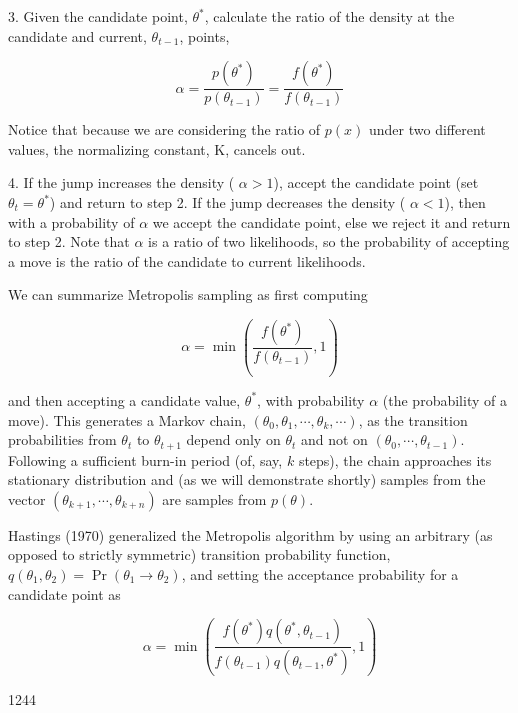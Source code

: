 \documentclass{article}
\begin{document}
3. Given the candidate point,  $ \theta^{*} $, calculate the ratio of the density at the candidate and current,  $ \theta_{t-1} $, points,

\begin{equation}
\alpha=\frac{p(\theta^{*})}{p(\theta_{t-1})}=\frac{f(\theta^{*})}{f(\theta_{t-1})}
\end{equation}

Notice that because we are considering the ratio of  $ p(x) $ under two different values, the normalizing constant, K, cancels out.

4. If the jump increases the density ( $ \alpha > 1 $), accept the candidate point (set  $ \theta_t = \theta^* $) and return to step 2. If the jump decreases the density ( $ \alpha < 1 $), then with a probability of  $ \alpha $ we accept the candidate point, else we reject it and return to step 2. Note that  $ \alpha $ is a ratio of two likelihoods, so the probability of accepting a move is the ratio of the candidate to current likelihoods.

We can summarize Metropolis sampling as first computing

\begin{equation}
\alpha=\min\left(\frac{f(\theta^{*})}{f(\theta_{t-1})},1\right)
\end{equation}

and then accepting a candidate value,  $ \theta^* $, with probability  $ \alpha $ (the probability of a move). This generates a Markov chain,  $ (\theta_0, \theta_1, \cdots, \theta_k, \cdots) $, as the transition probabilities from  $ \theta_t $ to  $ \theta_{t+1} $ depend only on  $ \theta_t $ and not on  $ (\theta_0, \cdots, \theta_{t-1}) $. Following a sufficient burn-in period (of, say,  $ k $ steps), the chain approaches its stationary distribution and (as we will demonstrate shortly) samples from the vector  $ (\theta_{k+1}, \cdots, \theta_{k+n}) $ are samples from  $ p(\theta) $.

Hastings (1970) generalized the Metropolis algorithm by using an arbitrary (as opposed to strictly symmetric) transition probability function,  $ q(\theta_1, \theta_2) = \Pr(\theta_1 \to \theta_2) $, and setting the acceptance probability for a candidate point as

\begin{equation}
\alpha=\min\left(\frac{f(\theta^{*})q(\theta^{*},\theta_{t-1})}{f(\theta_{t-1})q(\theta_{t-1},\theta^{*})},1\right)
\end{equation}

1244
\end{document}
